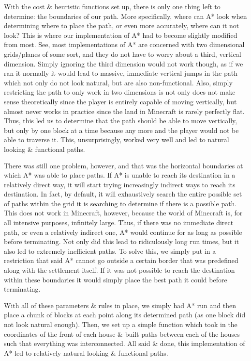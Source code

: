 \documentclass[11pt, oneside]{article}
\begin{document}
\begin{normalsize}
With the cost \& heuristic functions set up, there is only one thing left to determine: the boundaries of our path. 
More specifically, where can A* look when determining where to place the path, or even more accurately, where can it not look? 
This is where our implementation of A* had to become slightly modified from most. 
See, most implementations of A* are concerned with two dimensional grids/planes of some sort, and they do not have to worry about a third, vertical dimension. 
Simply ignoring the third dimension would not work though, as if we ran it normally it would lead to massive, immediate vertical jumps in the path which not only do not look natural, but are also non-functional. 
Also, simply restricting the path to only work in two dimensions is not only does not make sense theoretically since the player is entirely capable of moving vertically, but almost never works in practice since the land in Minecraft is rarely perfectly flat. 
Thus, this led us to determine that the path should be able to move vertically, but only by one block at a time because any more and the player would not be able to traverse it. 
This, unsurprisingly, worked very well and led to natural looking \& functional paths. 

There was still one problem, however, and that was the horizontal boundaries at which A* was able to place paths. 
If A* is unable to reach its destination in a relatively direct way, it will start trying increasingly indirect ways to reach its destination. 
In fact, by default, it will exhaustively search the entire possible set of paths within the grid it is searching to determine if there is a possible path. 
This does not work in Minecraft, however, because the world of Minecraft is, for all intensive purposes, infinitely large. 
Thus, if there was no immediate direct path, or even a relatively indirect one, A* would continue for as long as possible before terminating. 
Not only did this lead to ridiculously long run times, but it also led to extremely inefficient paths. 
To solve this, we simply put in a restriction that said A* cannot go outside a certain border that was predefined along with the settlement itself. 
If it was not possible to reach the destination within these boundaries it would simply place the best path it could before terminating. 

With all of these parameters \& rules in place, we simply had A* run and then place a chunk of blocks at each point along its determined path (as one block did not look natural enough). 
Then, we set up a simple function which took in the coordinates of the front of each house \& built paths between each of the houses such that everything was interconnected. 
All said \& done, this implementation of A* led to relatively natural looking \& functional paths. 


\end{normalsize}
\end{document}
